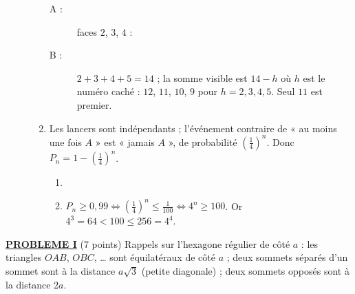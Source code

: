 \begin{description}
\begin{enumerate}
\begin{description}
			\item[A :] 
				faces $2$, $3$, $4$ : \par\noindent{}
			\item[B :] 
				$2 + 3 + 4 + 5 = 14$ ; la somme visible est $14 - h$ où $h$ est le numéro caché : $12$, $11$, $10$, $9$ pour $h = 2, 3, 4, 5$.
				Seul $11$ est premier. \par\noindent{}
		\end{description}
		\item Les lancers sont indépendants ; l'événement contraire de « au moins une fois $A$ » est « jamais $A$ », de probabilité $\left(\frac{1}{4}\right)^n$.
			Donc $P_n = 1 - \left(\frac{1}{4}\right)^n$.
		\begin{enumerate}
			\item {}
			\item {}
				$P_n \geq 0{,}99 \iff \left(\frac{1}{4}\right)^n \leq \frac{1}{100} \iff 4^n \geq 100$. Or $4^3 = 64 < 100 \leq 256 = 4^4$.
				\par\noindent{}
		\end{enumerate}
	\end{enumerate}
\end{description}
\noindent \underline{\textsc{\textbf{PROBLEME I}}} (7 points) \newline
Rappels sur l'hexagone régulier de côté $a$ : les triangles $OAB$, $OBC$, \ldots{} sont équilatéraux de côté $a$ ;
deux sommets séparés d'un sommet sont à la distance $a\sqrt{3}$ (petite diagonale) ; deux sommets opposés sont à la distance $2a$.
\begin{center}
\end{center}
